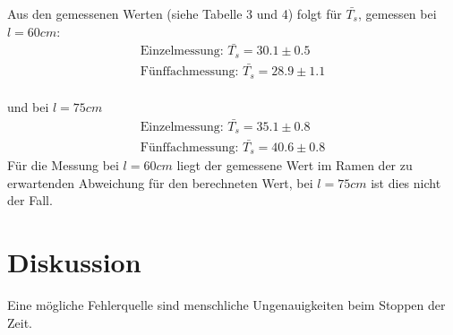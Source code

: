 Aus den gemessenen Werten (siehe Tabelle 3 und 4) folgt für $\bar{T_s}$, gemessen bei $l = 60cm$:
\begin{equation*}
\begin{split}
 \text{Einzelmessung: }\bar{T_{s}} = 30.1 \pm 0.5 \\
 \text{Fünffachmessung: }\bar{T_{s}} = 28.9 \pm 1.1
\end{split}
\end{equation*}
\\ und bei $l = 75cm$
\begin{equation*}
\begin{split}
 \text{Einzelmessung: }\bar{T_{s}} = 35.1 \pm 0.8 \\
 \text{Fünffachmessung: }\bar{T_{s}} = 40.6 \pm 0.8
\end{split}
\end{equation*}
Für die Messung bei $l = 60cm$ liegt der gemessene Wert im Ramen der zu erwartenden Abweichung für den berechneten Wert,
bei $l = 75cm$ ist dies nicht der Fall.
\section{Diskussion}
Eine mögliche Fehlerquelle sind menschliche Ungenauigkeiten beim Stoppen der Zeit.
\newpage
\nocite{*}
\printbibliography
